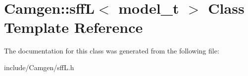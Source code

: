 \hypertarget{a00506}{}\section{Camgen\+:\+:sff\+L$<$ model\+\_\+t $>$ Class Template Reference}
\label{a00506}


The documentation for this class was generated from the following file\+:\begin{DoxyCompactItemize}
\item 
include/\+Camgen/sff\+L.\+h\end{DoxyCompactItemize}
